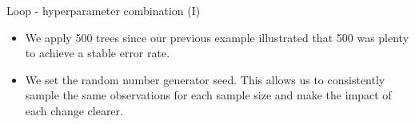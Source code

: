 \documentclass[
  10pt,
  ignorenonframetext,
]{beamer}
\newenvironment{Shaded}{}{}
\newcommand{\CommentTok}[1]{\textcolor[rgb]{0.00,0.50,0.00}{#1}}
\newcommand{\ControlFlowTok}[1]{\textcolor[rgb]{0.00,0.00,1.00}{#1}}
\newcommand{\DataTypeTok}[1]{#1}
\newcommand{\DecValTok}[1]{#1}
\newcommand{\KeywordTok}[1]{\textcolor[rgb]{0.00,0.00,1.00}{#1}}
\newcommand{\NormalTok}[1]{#1}
\newcommand{\OperatorTok}[1]{#1}
\newcommand{\StringTok}[1]{\textcolor[rgb]{0.00,0.50,0.50}{#1}}
\providecommand{\tightlist}{%
  \setlength{\itemsep}{0pt}\setlength{\parskip}{0pt}}
\begin{document}
\begin{frame}[fragile]{Loop - hyperparameter combination (I)}
\protect\hypertarget{loop---hyperparameter-combination-i}{}

\begin{itemize}
\tightlist
\item
  We apply 500 trees since our previous example illustrated that 500 was
  plenty to achieve a stable error rate.
\item
  We set the random number generator seed. This allows us to
  consistently sample the same observations for each sample size and
  make the impact of each change clearer.
\end{itemize}

\begin{Shaded}
\end{Shaded}

\end{frame}
\end{document}
